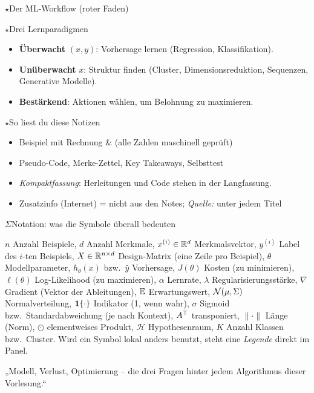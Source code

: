 \begin{hngrid}
\begin{hnp}[raster multicolumn=6,acc=hnnavy]{$\star$}{Der ML-Workflow (roter Faden)}
\end{hnp}
%
\begin{hnp}[raster multicolumn=3,acc=hnpurple]{$\star$}{Drei Lernparadigmen}
\begin{itemize}
\item \textbf{Überwacht} $(x,y)$: Vorhersage lernen (Regression, Klassifikation).
\item \textbf{Unüberwacht} $x$: Struktur finden (Cluster, Dimensionsreduktion, Sequenzen, Generative Modelle).
\item \textbf{Bestärkend}: Aktionen wählen, um Belohnung zu maximieren.
\end{itemize}
\end{hnp}
%
\begin{hnp}[raster multicolumn=3,acc=hngreen]{$\star$}{So liest du diese Notizen}
\begin{itemize}
\item \colorbox{hnmint}{Beispiel} mit Rechnung \& \hnsol{} (alle Zahlen maschinell geprüft)
\item \colorbox{hnblue}{Pseudo-Code}, \colorbox{hnyellow}{Merke-Zettel}, Key Takeaways, \colorbox{hnlilac}{Selbsttest}
\item \emph{Kompaktfassung}: Herleitungen und Code stehen in der Langfassung.
\item \colorbox{hnorange!20}{Zusatzinfo (Internet)} = nicht aus den Notes; \emph{Quelle:} unter jedem Titel
\end{itemize}
\end{hnp}
%
\begin{hnp}[raster multicolumn=6,acc=hnnavy]{$\Sigma$}{Notation: was die Symbole überall bedeuten}
\hnsmall\raggedright
$n$ Anzahl Beispiele, $d$ Anzahl Merkmale, $x^{(i)}\in\mathbb{R}^d$ Merkmalsvektor, $y^{(i)}$ Label des $i$-ten Beispiels, $X\in\mathbb{R}^{n\times d}$ Design-Matrix (eine Zeile pro Beispiel), $\theta$ Modellparameter, $h_\theta(x)$ bzw.\ $\hat y$ Vorhersage, $J(\theta)$ Kosten (zu minimieren), $\ell(\theta)$ Log-Likelihood (zu maximieren), $\alpha$ Lernrate, $\lambda$ Regularisierungsstärke, $\nabla$ Gradient (Vektor der Ableitungen), $\mathbb{E}$ Erwartungswert, $\mathcal{N}(\mu,\Sigma)$ Normalverteilung, $\mathbf{1}\{\cdot\}$ Indikator (1, wenn wahr), $\sigma$ Sigmoid bzw.\ Standardabweichung (je nach Kontext), $A^{\top}$ transponiert, $\|\cdot\|$ Länge (Norm), $\odot$ elementweises Produkt, $\mathcal H$ Hypothesenraum, $K$ Anzahl Klassen bzw.\ Cluster. Wird ein Symbol lokal anders benutzt, steht eine \emph{Legende} direkt im Panel.
\end{hnp}
%
\begin{hnbanner}[raster multicolumn=6]
„Modell, Verlust, Optimierung -- die drei Fragen hinter jedem Algorithmus dieser Vorlesung.“
\end{hnbanner}
\end{hngrid}
